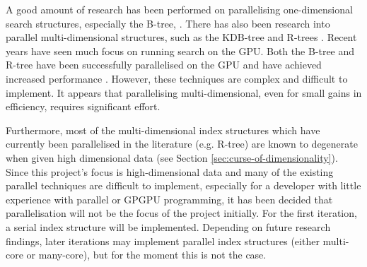 A good amount of research has been performed on parallelising one-dimensional search structures, especially the B-tree, \cite{btree-gpu1, btree-gpu2, btree-gpu3, fat-btree, multidisk-btree, parallel-btree}. There has also been research into parallel multi-dimensional structures, such as the KDB-tree \cite{traversing-spatial-indexes-gpu} and R-trees \cite{master-client-rtree, parallel-rtree, rtree-gpu1, rtree-gpu2}. Recent years have seen much focus on running search on the GPU. Both the B-tree and R-tree have been successfully parallelised on the GPU and have achieved increased performance \cite{btree-gpu2, rtree-gpu1}. However, these techniques are complex and difficult to implement. It appears that parallelising multi-dimensional, even for small gains in efficiency, requires significant effort.

Furthermore, most of the multi-dimensional index structures which have currently been parallelised in the literature (e.g. R-tree) are known to degenerate when given high dimensional data (see Section \ref{sec:curse-of-dimensionality}). Since this project's focus is high-dimensional data and many of the existing parallel techniques are difficult to implement, especially for a developer with little experience with parallel or GPGPU programming, it has been decided that parallelisation will not be the focus of the project initially. For the first iteration, a serial index structure will be implemented. Depending on future research findings, later iterations may implement parallel index structures (either multi-core or many-core), but for the moment this is not the case.

